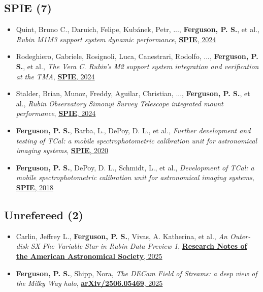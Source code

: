 \subsection{SPIE  (7)}
\begin{itemize}[itemsep=1pt]
    \item {Quint}, Bruno C., {Daruich}, Felipe, {Kub{\'a}nek}, Petr, ..., \textbf{Ferguson, P. S.}, et al., \textit{{Rubin M1M3 support system dynamic performance}}, \href{https://ui.adsabs.harvard.edu/abs/2024SPIE13094E..29Q}{\textbf{SPIE}, 2024}
    \item {Rodeghiero}, Gabriele, {Rosignoli}, Luca, {Canestrari}, Rodolfo, ..., \textbf{Ferguson, P. S.}, et al., \textit{{The Vera C. Rubin's M2 support system integration and verification at the TMA}}, \href{https://ui.adsabs.harvard.edu/abs/2024SPIE13094E..2DR}{\textbf{SPIE}, 2024}
    \item {Stalder}, Brian, {Munoz}, Freddy, {Aguilar}, Christian, ..., \textbf{Ferguson, P. S.}, et al., \textit{{Rubin Observatory Simonyi Survey Telescope integrated mount performance}}, \href{https://ui.adsabs.harvard.edu/abs/2024SPIE13094E..09S}{\textbf{SPIE}, 2024}
    \item \textbf{Ferguson, P. S.}, {Barba}, L., {DePoy}, D. L., et al., \textit{{Further development and testing of TCal: a mobile spectrophotometric calibration unit for astronomical imaging systems}}, \href{https://ui.adsabs.harvard.edu/abs/2020SPIE11447E..5UF}{\textbf{SPIE}, 2020}
    \item \textbf{Ferguson, P. S.}, {DePoy}, D. L., {Schmidt}, L., et al., \textit{{Development of TCal: a mobile spectrophotometric calibration unit for astronomical imaging systems}}, \href{https://ui.adsabs.harvard.edu/abs/2018SPIE10702E..3AF}{\textbf{SPIE}, 2018}
\end{itemize}
\subsection{Unrefereed  (2)}
\begin{itemize}[itemsep=1pt]
    \item {Carlin}, Jeffrey L., \textbf{Ferguson, P. S.}, {Vivas}, A. Katherina, et al., \textit{{An Outer-disk SX Phe Variable Star in Rubin Data Preview 1}}, \href{https://ui.adsabs.harvard.edu/abs/2025RNAAS...9..161C}{\textbf{Research Notes of the American Astronomical Society}, 2025}
    \item \textbf{Ferguson, P. S.}, {Shipp}, Nora, \textit{{The DECam Field of Streams: a deep view of the Milky Way halo}}, \href{https://ui.adsabs.harvard.edu/abs/2025arXiv250605469F}{\textbf{arXiv/2506.05469}, 2025}
\end{itemize}
